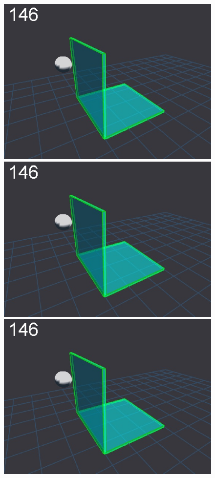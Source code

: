 \newlength{\imgBXwid}
\setlength{\imgBXwid}{2.2cm}
\begin{figure}[tb]
\centerline{
\includegraphics[width=\imgBXwid]{./B1_1exp_20_1}
\includegraphics[width=\imgBXwid]{./B1_2exp_20_1}
\includegraphics[width=\imgBXwid]{./B1_3exp_20_1}
}
\end{figure}

